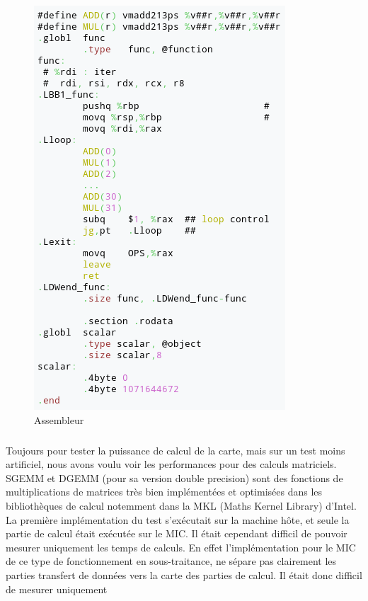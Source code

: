 \documentclass{article}
\begin{document}
					\begin{figure}
					\begin{center}
					\includegraphics[scale=0.40]{assembleur.png}
					\caption{Assembleur}
					\end{center}
					\end{figure}
					\subparagraph{}
					Toujours pour tester la puissance de calcul de la carte, mais sur un test moins artificiel, nous avons voulu
					voir les performances pour des calculs matriciels. SGEMM et DGEMM (pour sa version double precision) sont 
					des fonctions de multiplications de matrices très bien implémentées et optimisées dans les bibliothèques de 
					calcul notemment dans la MKL (Maths Kernel Library) d'Intel. \newline
					La première implémentation du test s'exécutait sur la machine hôte, et seule la partie de calcul était 
					exécutée sur le MIC. Il était cependant difficil de pouvoir mesurer uniquement les temps de calculs. En effet
					l'implémentation pour le MIC de ce type de fonctionnement en sous-traitance, ne sépare pas clairement les 
					parties transfert de données vers la carte des parties de calcul. Il était donc difficil de mesurer uniquement 
\end{document}
